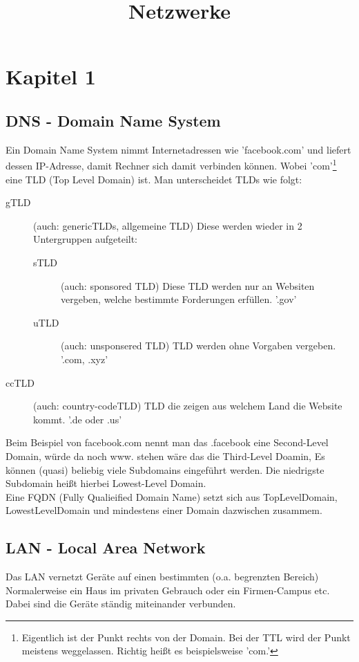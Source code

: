 \documentclass[a4paper,10pt]{scrartcl}
\title{Netzwerke}
\author{}
\date{}
\begin{document}
\maketitle
\newpage
\tableofcontents
\newpage
\section{Kapitel 1}
    \subsection{DNS - Domain Name System}
        Ein Domain Name System nimmt Internetadressen wie 'facebook.com' und liefert dessen IP-Adresse, 
        damit Rechner sich damit verbinden können. Wobei 'com'\footnote{Eigentlich ist der Punkt rechts von der Domain. Bei der TTL wird der Punkt meistens weggelassen. Richtig heißt es beispielsweise 'com.'} eine TLD (Top Level Domain) ist. Man unterscheidet TLDs wie folgt:
        \begin{description}
            \item [gTLD] (auch: genericTLDs, allgemeine TLD) Diese werden wieder in 2 Untergruppen aufgeteilt:
                \begin{description}
                    \item [sTLD] (auch: sponsored TLD) Diese TLD werden nur an Websiten vergeben, welche bestimmte Forderungen erfüllen. '.gov'
                    \item [uTLD] (auch: unsponsered TLD) TLD werden ohne Vorgaben vergeben. '.com, .xyz' 
                \end{description} 
            \item [ccTLD] (auch: country-codeTLD) TLD die zeigen aus welchem Land die Website kommt. '.de oder .us'
        \end{description}
        Beim Beispiel von facebook.com nennt man das .facebook eine Second-Level Domain, würde da noch www. stehen wäre das die Third-Level Doamin,
        Es können (quasi) beliebig viele Subdomains eingeführt werden. Die niedrigste Subdomain heißt hierbei Lowest-Level Domain. \\
        Eine FQDN (Fully Qualieified Domain Name) setzt sich aus TopLevelDomain, LowestLevelDomain und mindestens einer Domain dazwischen zusammem.
    \subsection{LAN - Local Area Network}
        Das LAN vernetzt Geräte auf einen bestimmten (o.a. begrenzten Bereich) Normalerweise ein Haus im privaten Gebrauch oder ein Firmen-Campus etc. Dabei sind die Geräte 
        ständig miteinander verbunden. 
\end{document}
